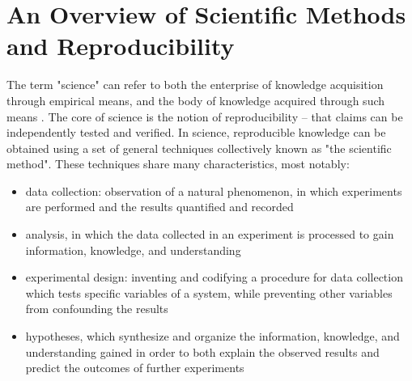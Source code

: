 \section{An Overview of Scientific Methods and Reproducibility}
The term "science" can refer to both the enterprise of knowledge acquisition 
through empirical means, and the body of knowledge acquired through such means 
\cite{drummond2012reproducible}.
The core of science is the notion of reproducibility 
\cite{russell2013reproducibility, nih2014reproducibility} -- that claims can be 
independently tested and verified.  In science, reproducible knowledge can be 
obtained using a set of general techniques collectively known as "the 
scientific method".  These techniques share many characteristics, most notably:
\begin{itemize}
 \item data collection: observation of a natural phenomenon, in which 
 experiments are performed and the results quantified and recorded
 \item analysis, in which the data collected in an experiment is processed to 
 gain information, knowledge, and understanding
 \item experimental design: inventing and codifying a procedure for data 
 collection which tests specific variables of a system, while preventing 
 other variables from confounding the results
 \item hypotheses, which synthesize and organize the information, knowledge, 
 and understanding gained in order to both explain the observed results and 
 predict the outcomes of further experiments
\end{itemize}

